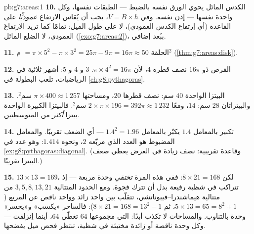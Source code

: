\begin{solution}{pb:g7:areas:1}
\textbf{10.} الكدس المائل يحوي الورق نفسه بالضبط
--- الطبقات نفسها، وكل واحدة  نفسها --- إذن 
نفسه. وفي $V = B \times h$، يجب أن يُقاس الارتفاع
\emph{عموديًّا} على القاعدة (أي اِرتفاع الكدس العمودي)،
لا على طول الميل: تمامًا كما تريد   الارتفاعَ العمودي، لا الضلع المائل
(\cref{exo:g7:areas:2})، ببُعد إضافي.

\textbf{11.} الحلقة $= \pi \times 5^2 - \pi \times 3^2 = 25\pi -
9\pi = 16\pi \approx 50$ م$^2$ (\cref{thm:g7:areas:disk}).

\textbf{12.} القرص ذو  $16\pi$ نصف قطره $4$، لأن
$\pi \times 4^2 = 16\pi$.  $3$ و $4$ و $5$: أشهر
ثلاثية في الرياضيات، تلعب البطولة في
\cref{ch:g8:pythagoras}.

\textbf{13.} البيتزا الواحدة $40$ سم: نصف قطرها $20$،
ومساحتها $\pi \times 400 \approx 1\,257$ سم$^2$. والبيتزاتان $28$ سم:
 $14$، ومعًا
$2 \times \pi \times 196 = 392\pi \approx 1\,232$ سم$^2$. فالبيتزا
الكبيرة الواحدة بيتزا \emph{أكثر} من المتوسطتين.

\textbf{14.} تكبير  بالمعامل $1.4$ يكبّر  بالمعامل
$1.4^2 = 1.96$ --- أي الضعف تقريبًا. والمعامل المضبوط هو
العدد الذي مربّعه $2$، ونحوه $1.414$: وهو عدد 
في \cref{ex:g8:pythagoras:diagonal}. (وقاعدة تقريبية: نصف زيادة
في العرض يعطي ضعف البيتزا تقريبًا.)

\textbf{15.} $13 \times 13 = 169$، لكن $8 \times 21 = 168$:
ففي هذه المرة \emph{تختفي} وحدة مربعة --- إذ تتراكب
 في شظية رفيعة بدل أن تترك فجوة. ومع
الحدود المتتالية $3, 5, 8, 13, 21$ من متتالية
هيماشندرا--فيبوناتشي، تتقلّب  بين واحد
زائد وواحد ناقص عن المربع ($5 \times 13 = 65 =
8^2 + 1$، ثم $8 \times 21 = 168 = 13^2 - 1$): فالساحر
«يكسب» و«يخسر» وحدة بالتناوب. والمساحات لا تكذب أبدًا:
 التي مجموعها $64$ تغطّي $64$، أينما اِنزلقت --- وكل
وحدة ناقصة أو زائدة مختبئة في شظية، تنتظر فحص ميل
يفضحها.
\end{solution}
